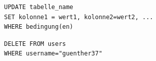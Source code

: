 \begin{landscape}
\begin{multicols*}{4}
\begin{tcolorboxTemplate}[title=Daten verändern: \texorpdfstring{\lstinline[style=sql]|UPDATE|}{UPDATE},colbacktitle=white, coltitle=black]
\begin{lstlisting}[style=sql]
UPDATE tabelle_name
SET kolonne1 = wert1, kolonne2=wert2, ...
WHERE bedingung(en)
\end{lstlisting}
\end{tcolorboxTemplate}

\begin{tcolorboxTemplate}[title=Einträge löschen: \texorpdfstring{\lstinline[style=sql]|DELETE FROM|}{DELETE FROM},colbacktitle=white, coltitle=black]
\begin{lstlisting}[style=sql]
DELETE FROM users
WHERE username="guenther37"
\end{lstlisting}
\end{tcolorboxTemplate}

\end{multicols*}
\end{landscape}
